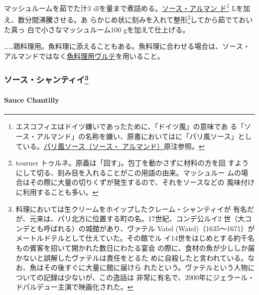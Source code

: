\begin{recette}
マッシュルームを茹でた汁3
dlを\untiers{}量まで煮詰める。\protect\hyperlink{sauce-allemande}{ソース・アルマン
ド}\footnote{エスコフィエはドイツ嫌いであったために、「ドイツ風」の意味であ
  る「ソース・アルマンド」の名称を嫌い、原書においてはに「パリ風ソース」としている。\protect\hyperlink{sauce-allemande}{パリ風ソース（ソース・
  アルマンド）}原注参照。}\troisquarts{} Lを加え、数分間沸騰させる。あ
らかじめ状に刻みを入れて整形\footnote{tourner
  トゥルネ。原義は「回す」。包丁を動かさずに材料の方を回
  すようにして切る、刻み目を入れることがこの用語の由来。マッシュルー
  ムの場合はその際に大量の切りくずが発生するので、それをソースなどの
  風味付けに利用することも多い。}してから茹でておいた真っ
白で小さなマッシュルーム100 gを加えて仕上げる。

\ldots{}\ldots{}鶏料理用。魚料理に添えることもある。魚料理に合わせる場合は、ソース・
アルマンドではなく\protect\hyperlink{veloute-de-poisson}{魚料理用ヴルテ}を用いること。

\maeaki

\hypertarget{ux30bdux30fcux30b9ux30b7ux30e3ux30f3ux30c6ux30a3ux30a422}{%
\subsubsection[ソース・シャンティイ]{\texorpdfstring{ソース・シャンティイ\footnote{料理においては生クリームをホイップしたクレーム・シャンティイが
  有名だが、元来は、パリ北方に位置する町の名。17世紀、コンデ公ルイ2
  世（大コンデとも呼ばれる）の城館があり、ヴァテル Vatel
  (Watel)（1635〜1671）がメートルドテルとして仕えていた。その館でル
  イ14世をはじめとする約千名もの賓客を招いて開かれた数日にわたる宴会
  の際に、食材の魚が少ししか届かないと誤解したヴァテルは責任をとるた
  めに自殺したと言われている。なお、魚はその後すぐに大量に館に届けら
  れたという。ヴァテルという人物についての記録は少ないが、この逸話は
  非常に有名で、2000年にジェラール・ドパルデュー主演で映画化された。}}{ソース・シャンティイ}}\label{ux30bdux30fcux30b9ux30b7ux30e3ux30f3ux30c6ux30a3ux30a422}}

\hypertarget{sauce-chantilly}{%
\paragraph{Sauce Chantilly}\label{sauce-chantilly}}



\end{recette}
